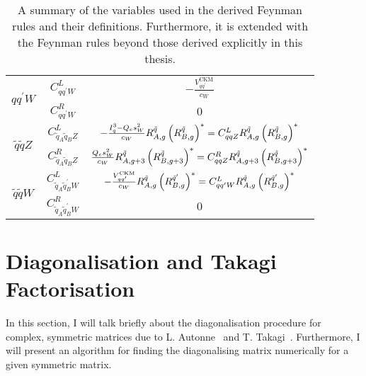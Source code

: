 \documentclass[../main.tex]{subfiles}
\begin{document}
{\begin{table}[ht!]
\begin{tabular}{|c|c|c|}
    \hline
    \multirow{2}{*}{\(q q^\prime W\)}                      & \(C_{qq^\prime W}^L\)                               & \(-\frac{V^\text{CKM}_{q q^\prime}}{c_W}\)                                                                                                                                                 \\
                                                           & \(C_{qq^\prime W}^R\)                               & 0                                                                                                                                                                                          \\
    \hline
    \multirow{2}{*}{\(\tilde{q} \tilde{q} Z\)}             & \(C_{\tilde{q}_A \tilde{q}_B Z}^L\)                 & \(-\frac{I^3_q - Q_e s_W^2}{c_W} R^{\tilde{q}}_{A,g} \left(R^{\tilde{q}}_{B,g}\right)^\ast = C_{qqZ}^{L} R^{\tilde{q}}_{A,g} \left(R^{\tilde{q}}_{B,g}\right)^\ast\)                             \\
                                                           & \(C_{\tilde{q}_A \tilde{q}_B Z}^R\)                 & \(\frac{Q_e s_W^2}{c_W} R^{\tilde{q}}_{A,g+3} \left(R^{\tilde{q}}_{B,g+3}\right)^\ast = C_{qqZ}^{R} R^{\tilde{q}}_{A,g+3} \left(R^{\tilde{q}}_{B,g+3}\right)^\ast\)                              \\
    \hline
    \multirow{2}{*}{\(\tilde{q} \tilde{q} W\)}             & \(C_{\tilde{q}_A \tilde{q}_B^\prime W}^L\)          & \(-\frac{V^\text{CKM}_{q q^\prime}}{c_W} R^{\tilde{q}}_{A,g} \left(R^{\tilde{q}^\prime}_{B,g}\right)^\ast = C_{qq^\prime W}^L R^{\tilde{q}}_{A,g} \left(R^{\tilde{q}^\prime}_{B,g}\right)^\ast\) \\
                                                           & \(C_{\tilde{q}_A \tilde{q}_B^\prime W}^R\)          & 0                                                                                                                                                                                          \\
    \hline
  \end{tabular}
  \caption{A summary of the variables used in the derived Feynman rules and their definitions.
    Furthermore, it is extended with the Feynman rules beyond those derived explicitly in this thesis.}
  \label{susy:tab:variable_definitions}
\end{table}
}




\section{Diagonalisation and Takagi Factorisation}
\label{susy:sec:takagi}
In this section, I will talk briefly about the diagonalisation procedure for complex, symmetric matrices due to L. Autonne~\cite{Autonne} and T. Takagi~\cite{Takagi}.
Furthermore, I will present an algorithm for finding the diagonalising matrix numerically for a given symmetric matrix.
\end{document}
